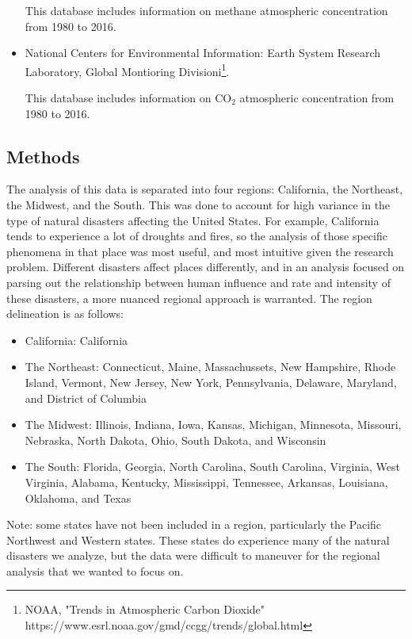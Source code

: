 \documentclass[10pt,]{article}
\let\rmarkdownfootnote\footnote%
\def\footnote{\protect\rmarkdownfootnote}
\begin{document}
\begin{itemize}
  This database includes information on methane atmospheric concentration from 1980 to 2016.
  \item National Centers for Environmental Information: Earth System Research Laboratory, Global Montioring Divisioni\footnote{NOAA, "Trends in Atmospheric Carbon Dioxide" https://www.esrl.noaa.gov/gmd/ccgg/trends/global.html}.
  
  This database includes information on CO$_2$ atmospheric concentration from 1980 to 2016.
\end{itemize}

\subsection{Methods}\label{methods}

The analysis of this data is separated into four regions: California,
the Northeast, the Midwest, and the South. This was done to account for
high variance in the type of natural disasters affecting the United
States. For example, California tends to experience a lot of droughts
and fires, so the analysis of those specific phenomena in that place was
most useful, and most intuitive given the research problem. Different
disasters affect places differently, and in an analysis focused on
parsing out the relationship between human influence and rate and
intensity of these disasters, a more nuanced regional approach is
warranted. The region delineation is as follows:

\begin{itemize}
  \item California: California
  \item The Northeast: Connecticut, Maine, Massachussets, New Hampshire, Rhode Island, Vermont, New Jersey, New York, Pennsylvania, Delaware, Maryland, and District of Columbia
  \item The Midwest: Illinois, Indiana, Iowa, Kansas, Michigan, Minnesota, Missouri, Nebraska, North Dakota, Ohio, South Dakota, and Wisconsin
  \item The South: Florida, Georgia, North Carolina, South Carolina, Virginia, West Virginia, Alabama, Kentucky, Mississippi, Tennessee, Arkansas, Louisiana, Oklahoma, and Texas
\end{itemize}

Note: some states have not been included in a region, particularly the
Pacific Northwest and Western states. These states do experience many of
the natural disasters we analyze, but the data were difficult to
maneuver for the regional analysis that we wanted to focus on.
\end{document}
